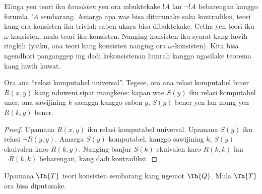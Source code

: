 \documentclass[../../../include/open-logic-section]{subfiles}
\begin{document}


\begin{explain}
Elinga yen teori iku \emph{konsisten} yen ora mbuktekake $!A$ lan
$\lnot !A$ bebarengan kanggo formula~$!A$ sembarang. Amarga apa wae
bisa diturunake saka kontradiksi, teori kang ora konsisten iku trivial:
saben ukara bisa dibuktekake. Cetha yen teori iku $\omega$-konsisten,
mula teori iku konsisten. Nanging konsisten iku syarat kang luwih
ringkih (yaiku, ana teori kang konsisten nanging ora $\omega$-konsisten).
Kita bisa ngendhori panganggep ing  dadi
kekonsistenan lumrah kanggo ngasilake teorema kang luwih kuwat.
\end{explain}

\begin{lem}
Ora ana ``relasi komputabel universal''. Tegese, ora ana relasi
komputabel biner $R(x,y)$ kang nduweni sipat mangkene:
kapan wae $S(y)$ iku relasi komputabel uner, ana sawijining $k$ saengga
kanggo saben $y$, $S(y)$ bener yen lan mung yen $R(k,y)$ bener.
\end{lem}

\begin{proof}
Upamana $R(x,y)$ iku relasi komputabel universal. Upamana $S(y)$
iku relasi $\lnot R(y,y)$. Amarga $S(y)$ komputabel, kanggo sawijining
$k$, $S(y)$ ekuivalen karo $R(k,y)$. Nanging banjur $S(k)$
ekuivalen karo $R(k,k)$ lan $\lnot R(k,k)$ bebarengan, kang dadi
kontradiksi.
\end{proof}


\begin{thm}
Upamana $\Th{T}$ teori konsisten sembarang kang ngemot $\Th{Q}$. Mula
$\Th{T}$ ora bisa diputusake.
\end{thm}
\end{document}
